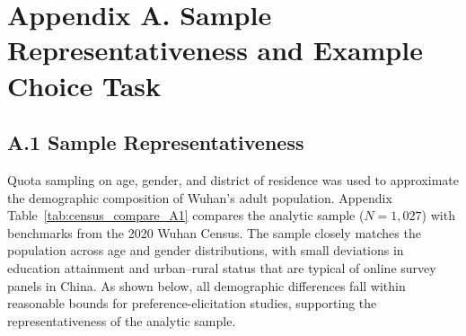 \documentclass[12pt]{article}
\begin{document}
\appendix
%




\clearpage
\printbibliography

\clearpage


\appendix

\section*{Appendix A. Sample Representativeness and Example Choice Task}

\subsection*{A.1 Sample Representativeness}

Quota sampling on age, gender, and district of residence was used to approximate the 
demographic composition of Wuhan’s adult population. Appendix Table~\ref{tab:census_compare_A1} 
compares the analytic sample (\(N = 1{,}027\)) with benchmarks from the 2020 Wuhan Census. 
The sample closely matches the population across age and gender distributions, with small 
deviations in education attainment and urban--rural status that are typical of online survey 
panels in China. As shown below, all demographic differences fall within reasonable bounds 
for preference-elicitation studies, supporting the representativeness of the analytic sample.
\end{document}
